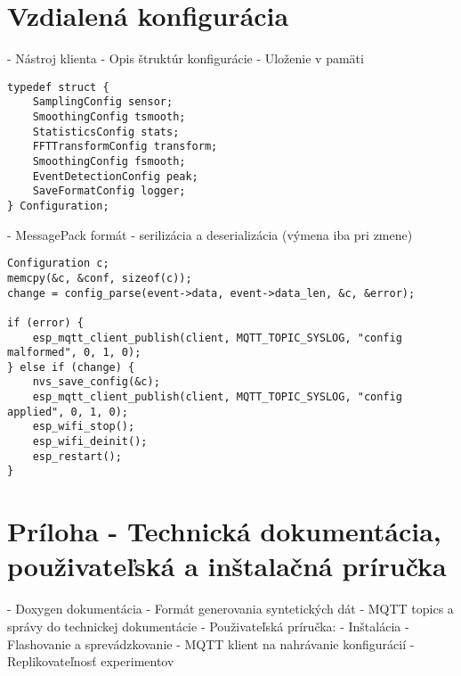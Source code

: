 \section{Vzdialená konfigurácia}
- Nástroj klienta
- Opis štruktúr konfigurácie
- Uloženie v pamäti
\begin{lstlisting}[style=cstyle]
typedef struct {
    SamplingConfig sensor;
    SmoothingConfig tsmooth;
    StatisticsConfig stats;
    FFTTransformConfig transform;
    SmoothingConfig fsmooth;
    EventDetectionConfig peak;
    SaveFormatConfig logger;
} Configuration;
\end{lstlisting}
- MessagePack formát - serilizácia a deserializácia (výmena iba pri zmene)

\begin{lstlisting}[style=cstyle]
Configuration c;
memcpy(&c, &conf, sizeof(c));
change = config_parse(event->data, event->data_len, &c, &error);

if (error) {
    esp_mqtt_client_publish(client, MQTT_TOPIC_SYSLOG, "config malformed", 0, 1, 0);
} else if (change) {
	nvs_save_config(&c);
	esp_mqtt_client_publish(client, MQTT_TOPIC_SYSLOG, "config applied", 0, 1, 0);
	esp_wifi_stop();
	esp_wifi_deinit();
	esp_restart();
}
\end{lstlisting}

\section{Príloha - Technická dokumentácia, použivateľská a inštalačná príručka}
- Doxygen dokumentácia
- Formát generovania syntetických dát
- MQTT topics a správy do technickej dokumentácie
- Použivateľská príručka: 
	- Inštalácia	
	- Flashovanie a sprevádzkovanie
	- MQTT klient na nahrávanie konfigurácií
- Replikovateľnosť experimentov

\emptypage
